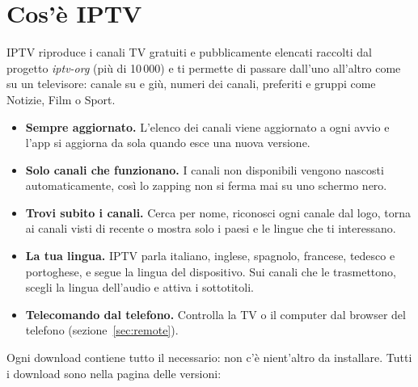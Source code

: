 \newcommand{\GuideLang}{italian}
\newcommand{\GuideTitle}{Guida rapida}
\newcommand{\TipLabel}{Suggerimento.}




\section{Cos'è IPTV}

IPTV riproduce i canali TV gratuiti e pubblicamente elencati raccolti dal
progetto \emph{iptv-org} (più di 10\,000) e ti permette di passare dall'uno
all'altro come su un televisore: canale su e giù, numeri dei canali,
preferiti e gruppi come Notizie, Film o Sport.

\begin{itemize}
  \item \textbf{Sempre aggiornato.} L'elenco dei canali viene aggiornato a ogni
        avvio e l'app si aggiorna da sola quando esce una nuova versione.
  \item \textbf{Solo canali che funzionano.} I canali non disponibili vengono
        nascosti automaticamente, così lo zapping non si ferma mai su uno
        schermo nero.
  \item \textbf{Trovi subito i canali.} Cerca per nome, riconosci ogni canale
        dal logo, torna ai canali visti di recente o mostra solo i paesi e le
        lingue che ti interessano.
  \item \textbf{La tua lingua.} IPTV parla italiano, inglese, spagnolo,
        francese, tedesco e portoghese, e segue la lingua del dispositivo. Sui
        canali che le trasmettono, scegli la lingua dell'audio e attiva i
        sottotitoli.
  \item \textbf{Telecomando dal telefono.} Controlla la TV o il computer dal
        browser del telefono (sezione~\ref{sec:remote}).
\end{itemize}

Ogni download contiene tutto il necessario: non c'è nient'altro da
installare. Tutti i download sono nella pagina delle versioni:

\begin{center}
  \download
\end{center}

